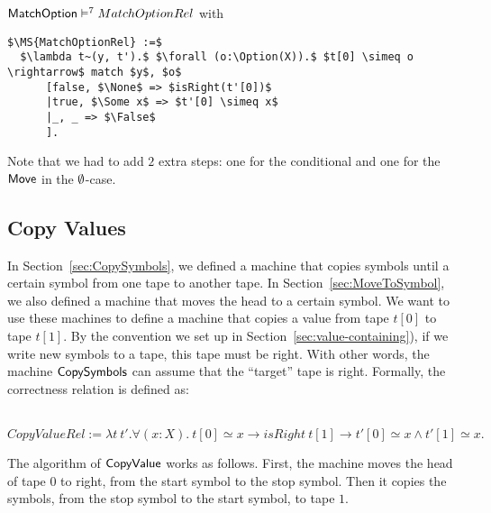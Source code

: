 \begin{lemma}
  \label{lem:MatchSum_Realise}
  $\textsf{MatchOption} \vDash^7 MatchOptionRel$ with
\begin{lstlisting}[style=semicoqstyle]
$\MS{MatchOptionRel} :=$
  $\lambda t~(y, t').$ $\forall (o:\Option(X)).$ $t[0] \simeq o \rightarrow$ match $y$, $o$
      [false, $\None$ => $isRight(t'[0])$
      |true, $\Some x$ => $t'[0] \simeq x$
      |_, _ => $\False$
      ].
\end{lstlisting}
\end{lemma}
Note that we had to add $2$ extra steps: one for the conditional and one for the $\textsf{Move}$ in the $\emptyset$-case.





\subsection{Copy Values}
\label{sec:copy}

In Section~\ref{sec:CopySymbols}, we {\color{red}defined} a machine that copies symbols until a certain symbol from one tape to another tape.  In
Section~\ref{sec:MoveToSymbol}, we also {\color{red}defined} a machine that moves the head to a certain symbol.  We want to use these machines to
define a machine that copies a value from tape $t[0]$ to tape $t[1]$.  By the convention we {\color{red}set up} in
Section~\ref{sec:value-containing}), if we write new symbols to a tape, this tape must be right.  With other words, the machine $\textsf{CopySymbols}$ can
assume that the ``target'' tape is right.  Formally, the correctness relation is defined as:
\begin{definition}
  \label{def:CopyValue_Rel}
  ~
  \[
    CopyValueRel := \lambda t~t'. \forall (x:X).~t[0] \simeq x \rightarrow isRight~t[1] \rightarrow t'[0] \simeq x \land t'[1] \simeq x.
  \]
\end{definition}

The algorithm of $\textsf{CopyValue}$ works as follows.  First, the machine moves the head of tape $0$ to right, from the start symbol to the stop symbol.
Then it copies the symbols, from the stop symbol to the start symbol, to tape $1$.

